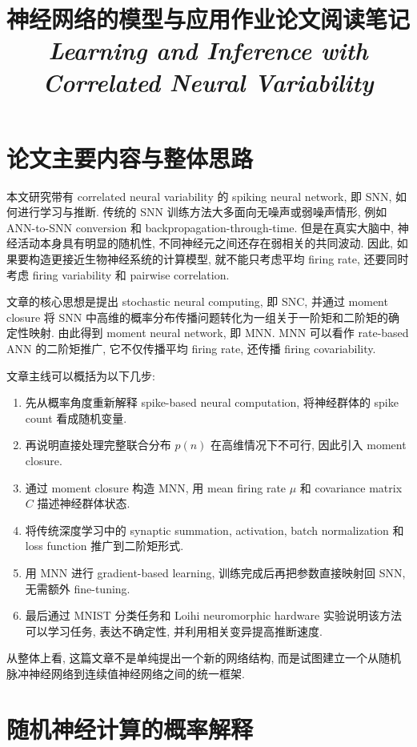 \documentclass[oneside]{ctexart}
\title{神经网络的模型与应用作业论文阅读笔记\\[0.6ex]
\large \textit{Learning and Inference with Correlated Neural Variability}}
\author{}
\date{}
\begin{document}
\maketitle

\section{论文主要内容与整体思路}

本文研究带有 correlated neural variability 的 spiking neural network, 即 SNN, 如何进行学习与推断. 传统的 SNN 训练方法大多面向无噪声或弱噪声情形, 例如 ANN-to-SNN conversion 和 backpropagation-through-time. 但是在真实大脑中, 神经活动本身具有明显的随机性, 不同神经元之间还存在弱相关的共同波动. 因此, 如果要构造更接近生物神经系统的计算模型, 就不能只考虑平均 firing rate, 还要同时考虑 firing variability 和 pairwise correlation.

文章的核心思想是提出 stochastic neural computing, 即 SNC, 并通过 moment closure 将 SNN 中高维的概率分布传播问题转化为一组关于一阶矩和二阶矩的确定性映射. 由此得到 moment neural network, 即 MNN. MNN 可以看作 rate-based ANN 的二阶矩推广, 它不仅传播平均 firing rate, 还传播 firing covariability.

文章主线可以概括为以下几步:

\begin{enumerate}[(1)]
    \item 先从概率角度重新解释 spike-based neural computation, 将神经群体的 spike count 看成随机变量.
    \item 再说明直接处理完整联合分布 $p(n)$ 在高维情况下不可行, 因此引入 moment closure.
    \item 通过 moment closure 构造 MNN, 用 mean firing rate $\mu$ 和 covariance matrix $C$ 描述神经群体状态.
    \item 将传统深度学习中的 synaptic summation, activation, batch normalization 和 loss function 推广到二阶矩形式.
    \item 用 MNN 进行 gradient-based learning, 训练完成后再把参数直接映射回 SNN, 无需额外 fine-tuning.
    \item 最后通过 MNIST 分类任务和 Loihi neuromorphic hardware 实验说明该方法可以学习任务, 表达不确定性, 并利用相关变异提高推断速度.
\end{enumerate}

从整体上看, 这篇文章不是单纯提出一个新的网络结构, 而是试图建立一个从随机脉冲神经网络到连续值神经网络之间的统一框架.

\section{随机神经计算的概率解释}
\end{document}
